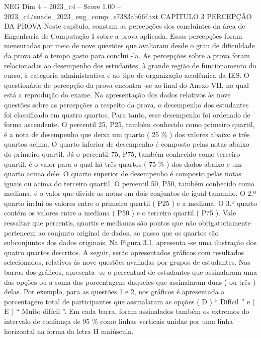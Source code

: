 \begin{textsample}{NEG Dim 4 – 2023\_c4 – Score 1.00 – 2023\_c4/enade\_2023\_eng\_comp\_e7383ab66f.txt}  \label{ex:f4_neg_192}
CAPÍTULO 3 PERCEPÇÃO DA PROVA Neste capítulo, constam as percepções dos concluintes da área de Engenharia de Computação I sobre a prova aplicada.
Essas percepções foram mensuradas por meio de nove questões que avaliaram desde o grau de dificuldade da prova até o tempo gasto para concluí -la.
As percepções sobre a prova foram relacionadas ao desempenho dos estudantes, à grande região de funcionamento do curso, à categoria administrativa e ao tipo de organização acadêmica da IES.
O questionário de percepção da prova encontra -se ao final do Anexo VII, no qual está a reprodução do exame.
Na apresentação dos dados relativos às nove questões sobre as percepções a respeito da prova, o desempenho dos estudantes foi classificado em quatro quartos.
Para tanto, esse desempenho foi ordenado de forma ascendente.
O percentil 25, P25, também conhecido como primeiro quartil, é a nota de desempenho que deixa um quarto ( 25 \% ) dos valores abaixo e três quartos acima.
O quarto inferior de desempenho é composto pelas notas abaixo do primeiro quartil.
Já o percentil 75, P75, também conhecido como terceiro quartil, é o valor para o qual há três quartos ( 75 \% ) dos dados abaixo e um quarto acima dele.
O quarto superior de desempenho é composto pelas notas iguais ou acima do terceiro quartil.
O percentil 50, P50, também conhecido como mediana, é o valor que divide as notas em dois conjuntos de igual tamanho.
O 2.º quarto inclui os valores entre o primeiro quartil ( P25 ) e a mediana.
O 3.º quarto contém os valores entre a mediana ( P50 ) e o terceiro quartil ( P75 ).
Vale ressaltar que percentis, quartis e medianas são pontos que não obrigatoriamente pertencem ao conjunto original de dados, ao passo que os quartos são subconjuntos dos dados originais.
Na Figura 3.1, apresenta -se uma ilustração dos quatro quartos descritos.
A seguir, serão apresentados gráficos com resultados selecionados, relativos às nove questões avaliadas por grupos de estudantes.
Nas barras dos gráficos, apresenta -se o percentual de estudantes que assinalaram uma das opções ou a soma das porcentagens daqueles que assinalaram duas ( ou três ) delas.
Por exemplo, para as questões 1 e 2, nos gráficos é apresentada a porcentagem total de participantes que assinalaram as opções ( D ) “ Difícil ” e ( E ) “ Muito difícil ”.
Em cada barra, foram assinalados também os extremos do intervalo de confiança de 95 \% como linhas verticais unidas por uma linha horizontal na forma da letra H maiúscula.

\end{textsample}
